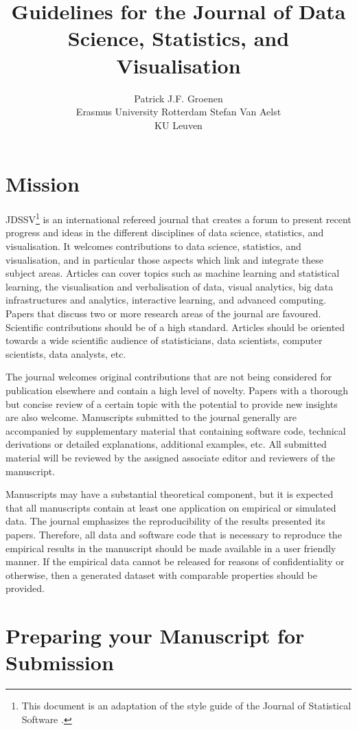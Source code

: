 \documentclass[
]{jdssv}
\author{
Patrick J.F. Groenen\\Erasmus University Rotterdam \And Stefan Van
Aelst\\KU Leuven
}
\title{Guidelines for the Journal of Data Science, Statistics, and
Visualisation}
\begin{document}
\hypertarget{mission}{%
\section{Mission}\label{mission}}

JDSSV\footnote{This document is an adaptation of the style guide of the Journal of Statistical Software \citep{jss_style_guide}.}
is an international refereed journal that creates a forum to present
recent progress and ideas in the different disciplines of data science,
statistics, and visualisation. It welcomes contributions to data
science, statistics, and visualisation, and in particular those aspects
which link and integrate these subject areas. Articles can cover topics
such as machine learning and statistical learning, the visualisation and
verbalisation of data, visual analytics, big data infrastructures and
analytics, interactive learning, and advanced computing. Papers that
discuss two or more research areas of the journal are favoured.
Scientific contributions should be of a high standard. Articles should
be oriented towards a wide scientific audience of statisticians, data
scientists, computer scientists, data analysts, etc.

The journal welcomes original contributions that are not being
considered for publication elsewhere and contain a high level of
novelty. Papers with a thorough but concise review of a certain topic
with the potential to provide new insights are also welcome. Manuscripts
submitted to the journal generally are accompanied by supplementary
material that containing software code, technical derivations or
detailed explanations, additional examples, etc. All submitted material
will be reviewed by the assigned associate editor and reviewers of the
manuscript.

Manuscripts may have a substantial theoretical component, but it is
expected that all manuscripts contain at least one application on
empirical or simulated data. The journal emphasizes the reproducibility
of the results presented its papers. Therefore, all data and software
code that is necessary to reproduce the empirical results in the
manuscript should be made available in a user friendly manner. If the
empirical data cannot be released for reasons of confidentiality or
otherwise, then a generated dataset with comparable properties should be
provided.

\hypertarget{preparing-your-manuscript-for-submission}{%
\section{Preparing your Manuscript for
Submission}\label{preparing-your-manuscript-for-submission}}
\end{document}
